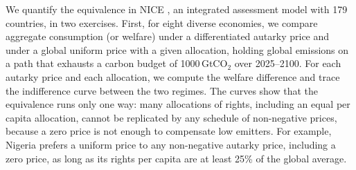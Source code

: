 \documentclass[12pt,english]{article}
\theoremstyle{remark}
\begin{document}

We quantify the equivalence in NICE \citep{young-brun_within-country_2025}, an integrated assessment model with 179 countries, %
in two exercises. %
First, for eight diverse economies, we compare aggregate consumption (or welfare) under a differentiated autarky price and under a global uniform price with a given allocation, holding global emissions on a path that exhausts a carbon budget of 1000\,GtCO$_2$ over 2025--2100. For each autarky price
and each allocation, we compute the welfare difference and trace the indifference
curve between the two regimes. %
The curves show that the equivalence runs only one way: many allocations of rights, including an equal per capita allocation, cannot be replicated by any schedule of non-negative prices, because a zero price is not enough to compensate low emitters. For example, Nigeria prefers a uniform price to any non-negative autarky price, including a zero price, as long as its rights per capita are at least 25\% of the global average. %
\end{document}
